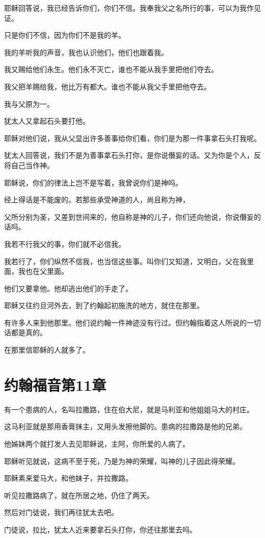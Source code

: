 \documentclass[12pt,oneside]{book}
\begin{document}
耶稣回答说，我已经告诉你们，你们不信。我奉我父之名所行的事，可以为我作见证。

只是你们不信，因为你们不是我的羊。

我的羊听我的声音，我也认识他们，他们也跟着我。

我又赐给他们永生。他们永不灭亡，谁也不能从我手里把他们夺去。

我父把羊赐给我，他比万有都大。谁也不能从我父手里把他夺去。

我与父原为一。

犹太人又拿起石头要打他。

耶稣对他们说，我从父显出许多善事给你们看，你们是为那一件事拿石头打我呢。

犹太人回答说，我们不是为善事拿石头打你，是你说僭妄的话。又为你是个人，反将自己当作神。

耶稣说，你们的律法上岂不是写着，我曾说你们是神吗。

经上得话是不能废的。若那些承受神道的人，尚且称为神，

父所分别为圣，又差到世间来的，他自称是神的儿子，你们还向他说，你说僭妄的话吗。

我若不行我父的事，你们就不必信我。

我若行了，你们纵然不信我，也当信这些事。叫你们又知道，又明白，父在我里面，我也在父里面。

他们又要拿他。他却逃出他们的手走了。

耶稣又往约旦河外去，到了约翰起初施洗的地方，就住在那里。

有许多人来到他那里。他们说约翰一件神迹没有行过。但约翰指着这人所说的一切话都是真的。

在那里信耶稣的人就多了。

\chapter{约翰福音第11章}
有一个患病的人，名叫拉撒路，住在伯大尼，就是马利亚和他姐姐马大的村庄。

这马利亚就是那用香膏抹主，又用头发擦他脚的。患病的拉撒路是他的兄弟。

他姊妹两个就打发人去见耶稣说，主阿，你所爱的人病了。

耶稣听见就说，这病不至于死，乃是为神的荣耀，叫神的儿子因此得荣耀。

耶稣素来爱马大，和他妹子，并拉撒路。

听见拉撒路病了，就在所居之地，仍住了两天。

然后对门徒说，我们再往犹太去吧。

门徒说，拉比，犹太人近来要拿石头打你，你还往那里去吗。
\end{document}
